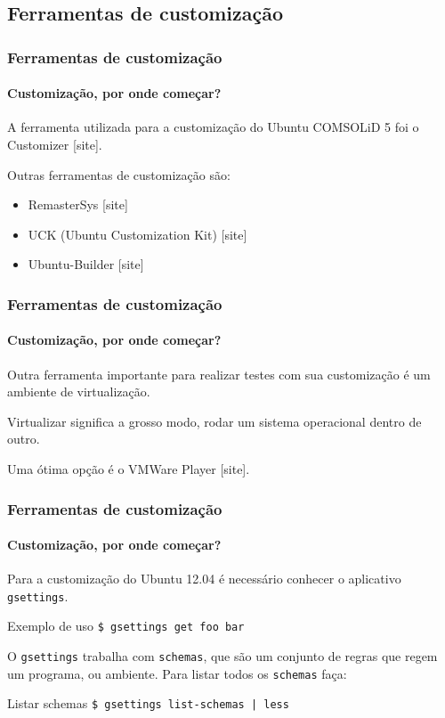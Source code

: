 \subsection{Ferramentas de customização}

\begin{frame}


\end{frame}

\begin{frame}\frametitle{Ferramentas de customização}\framesubtitle{Customização, por onde começar?}

A ferramenta utilizada para a customização do Ubuntu COMSOLiD 5 foi o Customizer [site].


Outras ferramentas de customização são:

\begin{itemize}
	\item RemasterSys [site]
	\item UCK (Ubuntu Customization Kit) [site]
	\item Ubuntu-Builder [site]
\end{itemize}

\end{frame}


\begin{frame}\frametitle{Ferramentas de customização}\framesubtitle{Customização, por onde começar?}

Outra ferramenta importante para realizar testes com sua customização é um ambiente de virtualização.

\medskip

Virtualizar significa a grosso modo, rodar um sistema operacional dentro de outro.

\medskip

Uma ótima opção é o VMWare Player [site].

\end{frame}

\begin{frame}\frametitle{Ferramentas de customização}\framesubtitle{Customização, por onde começar?}

Para a customização do Ubuntu 12.04 é necessário conhecer o aplicativo \texttt{gsettings}.

\begin{block}{Exemplo de uso}
\texttt{\$ gsettings get foo bar}
\end{block}

\medskip

O \texttt{gsettings} trabalha com \texttt{schemas}, que são um conjunto de regras que regem um programa,
ou ambiente. Para listar todos os \texttt{schemas} faça:

\begin{block}{Listar schemas}
\texttt{\$ gsettings list-schemas | less}
\end{block}

\end{frame}


